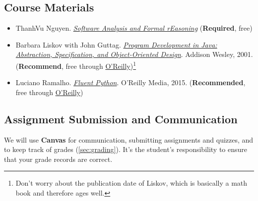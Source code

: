 \documentclass[11pt]{article}
\begin{document}
\subsection{Course Materials}
\begin{itemize}
    \item ThanhVu Nguyen. \href{https://nguyenthanhvuh.github.io/class-oo/safe.pdf}{\emph{Software Analysis and Formal rEasoning}} (\textbf{Required}, free)


    \item Barbara Liskov with John Guttag. \href{https://www.amazon.com/Program-Development-Java-Specification-Object-Oriented/dp/0201657686/ref=sr_1_2?dchild=1&qid=1626231221&refinements=p_27\%3ABarbara+Liskov&s=books&sr=1-2&text=Barbara+Liskov}{\emph{Program
  Development in Java: Abstraction, Specification, and Object-Oriented  Design}}. Addison Wesley, 2001.  (\textbf{Recommend}, free through \href{https://learning.oreilly.com/library/view/program-development-in/9780768685299/}{ O'Reilly})\footnote{Don't worry about the publication date of Liskov, which is basically a math book and therefore ages well.}

    \item Luciano Ramalho. \href{https://www.amazon.com/Fluent-Python-Concise-Effective-Programming-dp-1492056359/dp/1492056359/ref=dp_ob_title_bk}{\emph{Fluent Python}}. O'Reilly Media, 2015. (\textbf{Recommended}, free through \href{https://learning.oreilly.com/library/view/fluent-python/9781492056348/}{O'Reilly})


\end{itemize}


\subsection{Assignment Submission and Communication}

We will use \textbf{Canvas} for communication, submitting assignments and quizzes, and to keep track of grades (\autoref{sec:grading}).  
It's the student's responsibility to ensure that your grade records are correct.
\end{document}

